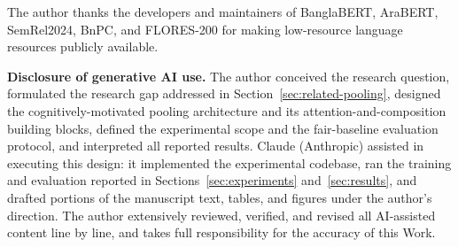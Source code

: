 \documentclass[manuscript]{acmart}
\begin{document}
\begin{acks}
The author thanks the developers and maintainers of BanglaBERT, AraBERT, SemRel2024, BnPC, and FLORES-200 for making low-resource language resources publicly available.

\textbf{Disclosure of generative AI use.} The author conceived the research question, formulated the research gap addressed in Section~\ref{sec:related-pooling}, designed the cognitively-motivated pooling architecture and its attention-and-composition building blocks, defined the experimental scope and the fair-baseline evaluation protocol, and interpreted all reported results. Claude (Anthropic) assisted in executing this design: it implemented the experimental codebase, ran the training and evaluation reported in Sections~\ref{sec:experiments} and~\ref{sec:results}, and drafted portions of the manuscript text, tables, and figures under the author's direction. The author extensively reviewed, verified, and revised all AI-assisted content line by line, and takes full responsibility for the accuracy of this Work.
\end{acks}
\end{document}
